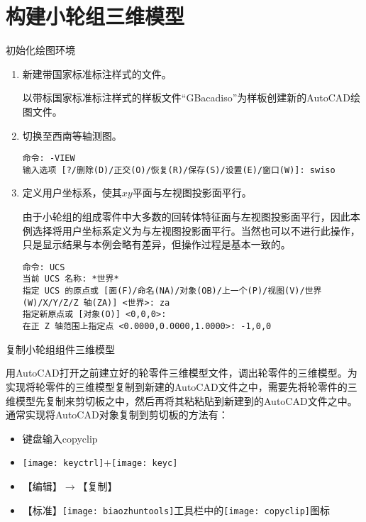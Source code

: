 \section{构建小轮组三维模型}
\begin{procedure}
\item 初始化绘图环境

\begin{enumerate}
\item 新建带国家标准标注样式的文件。

以带标国家标准标注样式的样板文件“GBacadiso”为样板创建新的AutoCAD绘图文件。

\item 切换至西南等轴测图。

\begin{lstlisting}
命令: -VIEW
输入选项 [?/删除(D)/正交(O)/恢复(R)/保存(S)/设置(E)/窗口(W)]: swiso
\end{lstlisting}

\item 定义用户坐标系，使其$xy$平面与左视图投影面平行。

由于小轮组的组成零件中大多数的回转体特征面与左视图投影面平行，因此本例选择将用户坐标系定义为与左视图投影面平行。当然也可以不进行此操作，只是显示结果与本例会略有差异，但操作过程是基本一致的。

\begin{lstlisting}
命令: UCS
当前 UCS 名称: *世界*
指定 UCS 的原点或 [面(F)/命名(NA)/对象(OB)/上一个(P)/视图(V)/世界(W)/X/Y/Z/Z 轴(ZA)] <世界>: za
指定新原点或 [对象(O)] <0,0,0>:
在正 Z 轴范围上指定点 <0.0000,0.0000,1.0000>: -1,0,0
\end{lstlisting}
\end{enumerate}

\item 复制小轮组组件三维模型

用AutoCAD打开之前建立好的轮零件三维模型文件，调出轮零件的三维模型。为实现将轮零件的三维模型复制到新建的AutoCAD文件之中，需要先将轮零件的三维模型先复制来剪切板之中，然后再将其粘粘贴到新建到的AutoCAD文件之中。通常实现将AutoCAD对象复制到剪切板的方法有：
\begin{itemize}
\item 键盘输入copyclip
\item \texttt{[image: keyctrl]}+\texttt{[image: keyc]}
\item 【编辑】$\rightarrow $【复制】
\item 【标准】\texttt{[image: biaozhuntools]}工具栏中的\texttt{[image: copyclip]}图标
\end{itemize}


\end{procedure}
